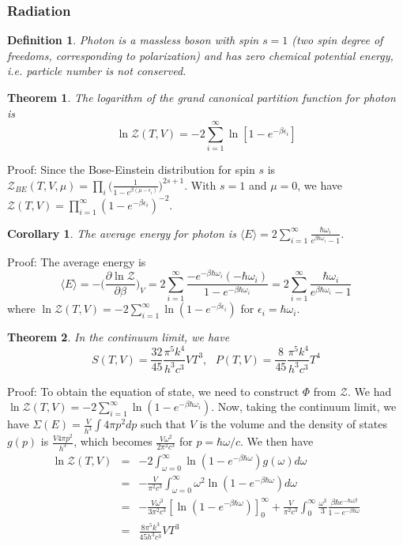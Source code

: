 \documentclass[a4paper]{article}
\newtheorem{defi}{Definition}[section]
\newtheorem{thm}{Theorem}[section]
\newtheorem{cor}{Corollary}[section]
\theoremstyle{new}
\begin{document}
\subsubsection*{Radiation}
\begin{defi}
Photon is a massless boson with spin $s=1$ (two spin degree of freedoms, corresponding to polarization) and has zero chemical potential energy, i.e. particle number is not conserved.
\end{defi}
\begin{thm}
The logarithm of the grand canonical partition function for photon is
$$\ln\mathcal{Z}(T,V)=-2\sum_{i=1}^\infty\ln[1-e^{-\beta\epsilon_i}]$$
\end{thm}
Proof: Since the Bose-Einstein distribution for spin $s$ is $\mathcal{Z}_{BE}(T,V,\mu)=\prod_i\bigg(\frac{1}{1-e^{\beta(\mu-\epsilon_i)}}\bigg)^{2s+1}$. With $s=1$ and $\mu=0$, we have $\mathcal{Z}(T,V)=\prod_{i=1}^\infty(1-e^{-\beta\epsilon_i})^{-2}$. 
\begin{cor}
The average energy for photon is $\langle E\rangle=2\sum_{i=1}^\infty\frac{\hbar\omega_i}{e^{\beta\hbar\omega_i}-1}$.
\end{cor}
Proof: The average energy is 
$$\langle E\rangle=-\bigg(\frac{\partial\ln\mathcal{Z}}{\partial\beta}\bigg)_V=2\sum_{i=1}^\infty\frac{-e^{-\beta\hbar\omega_i}(-\hbar\omega_i)}{1-e^{-\beta\hbar\omega_i}}=2\sum_{i=1}^\infty\frac{\hbar\omega_i}{e^{\beta\hbar\omega_i}-1}$$
where $\ln\mathcal{Z}(T,V)=-2\sum_{i=1}^\infty\ln(1-e^{-\beta\epsilon_i})$ for $\epsilon_i=\hbar\omega_i$. 
\begin{thm}
In the continuum limit, we have
$$S(T,V)=\frac{32}{45}\frac{\pi^5k^4}{h^3c^3}VT^3,\text{    }P(T,V)=\frac{8}{45}\frac{\pi^5k^4}{h^3c^3}T^4$$
\end{thm}
Proof: To obtain the equation of state, we need to construct $\Phi$ from $\mathcal{Z}$. We had $\ln\mathcal{Z}(T,V)=-2\sum_{i=1}^\infty\ln(1-e^{-\beta\hbar\omega_i})$. Now, taking the continuum limit, we have $\Sigma(E)=\frac{V}{h^3}\int 4\pi p^2dp$ such that $V$ is the volume and the density of states $g(p)$ is $\frac{V4\pi p^2}{h^3}$, which becomes $\frac{V\omega^2}{2\pi^2c^3}$ for $p=\hbar\omega/c$. We then have
\begin{eqnarray}
\ln\mathcal{Z}(T,V)&=&-2\int_{\omega=0}^\infty\ln(1-e^{-\beta\hbar\omega})g(\omega)d\omega\nonumber\\&=&-\frac{V}{\pi^2c^3}\int_{\omega=0}^\infty \omega^2\ln(1-e^{-\beta\hbar\omega})d\omega\nonumber\\&=&-\frac{V\omega^3}{3\pi^2c^3}[\ln(1-e^{-\beta\hbar\omega})]^\infty_0+\frac{V}{\pi^2c^3}\int_0^\infty\frac{\omega^3}{3}\frac{\beta\hbar e^{-\hbar\omega\beta}}{1-e^{-\beta\hbar\omega}}\nonumber\\&=&\frac{8\pi^5k^3}{45h^3c^3}VT^3\nonumber
\end{eqnarray}
\end{document}
